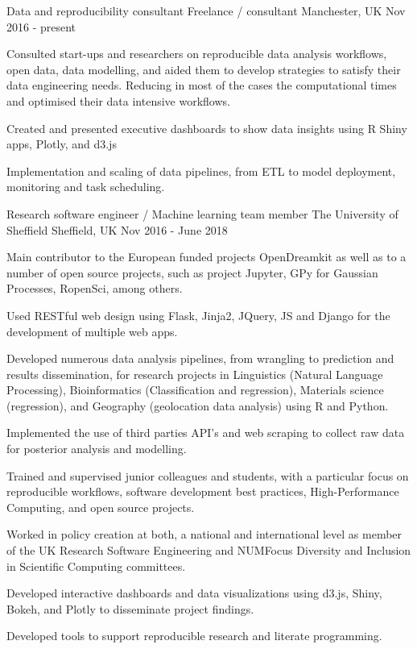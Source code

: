 \begin{cventries}
\cventry
{Data and reproducibility consultant } %
{Freelance / consultant } %
{Manchester,  UK} %
{Nov 2016 - present } %
{ %
\begin{cvitems}
\item {Consulted start-ups and researchers on reproducible data analysis workflows, open data, data modelling, and aided them to develop strategies to satisfy their data engineering needs. Reducing in most of the cases the computational times and optimised their data intensive workflows.}
 \item {Created and presented executive dashboards to show data insights using R Shiny apps, Plotly, and d3.js}
 \item {Implementation and scaling of data pipelines, from ETL to model deployment, monitoring and task scheduling.}
\end{cvitems}
}



\cventry
{Research software engineer  / Machine learning team member } %
{The University of Sheffield } %
{Sheffield, UK} %
{Nov 2016 - June 2018 } %
{ %
\begin{cvitems}
\item {Main contributor to  the European funded projects OpenDreamkit as well as to a number of open source projects, such as project Jupyter, GPy for Gaussian Processes, RopenSci, among others.}
\item {Used RESTful web design using Flask, Jinja2, JQuery, JS and Django for the development of multiple web apps.}
\item {Developed numerous data analysis pipelines, from wrangling to prediction and results dissemination, for research projects in Linguistics (Natural Language Processing), Bioinformatics (Classification and regression), Materials science (regression), and Geography (geolocation data analysis) using R and Python.}
\item { Implemented the use of third parties API's and web scraping to collect raw data for posterior analysis and modelling.}
\item {Trained and supervised junior colleagues and students, with a particular focus on reproducible workflows, software development best practices, High-Performance Computing, and open source projects.}
\item {Worked in policy creation at both, a national and international level as member of the UK Research Software Engineering and NUMFocus Diversity and Inclusion in Scientific Computing committees.}
\item {Developed interactive dashboards and data visualizations using d3.js, Shiny, Bokeh, and Plotly to disseminate project findings.}
\item{Developed tools to support reproducible research and literate programming.}
\end{cvitems}
}



\end{cventries}
